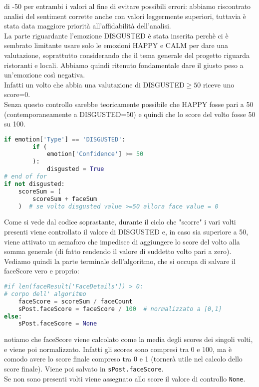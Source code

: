 di -50 per entrambi i valori al fine di evitare possibili errori: abbiamo riscontrato analisi del 
sentiment corrette anche con valori leggermente superiori, tuttavia è stata data maggiore priorità
all'affidabilità dell'analisi. \\
La parte riguardante l'emozione DISGUSTED è stata inserita perchè ci è sembrato limitante usare
solo le emozioni HAPPY e CALM per dare una valutazione, soprattutto considerando che il tema
generale del progetto riguarda ristoranti e locali. Abbiamo quindi ritenuto
fondamentale dare il giusto peso a un'emozione così negativa. \\
Infatti un volto che abbia una
valutazione di DISGUSTED$\geq50$ riceve uno score=0. \\
Senza questo controllo sarebbe teoricamente
possibile che HAPPY fosse pari a 50 (contemporaneamente a DISGUSTED=50) e quindi che lo score 
del volto fosse 50 su 100.
\begin{lstlisting}[language=Python]
    if emotion['Type'] == 'DISGUSTED':
        if (
            emotion['Confidence'] >= 50
        ):  
            disgusted = True
# end of for
if not disgusted:
    scoreSum = (
        scoreSum + faceSum
    )  # se volto disgusted value >=50 allora face value = 0
\end{lstlisting}
Come si vede dal codice soprastante, durante il ciclo che "scorre" i vari volti presenti viene
controllato il valore di DISGUSTED e, in caso sia superiore a 50, viene attivato un semaforo 
che impedisce di aggiungere lo score del volto alla somma generale (di fatto rendendo il valore
di suddetto volto pari a zero).\\
Vediamo quindi la parte terminale dell'algoritmo, che si occupa di salvare il faceScore vero e proprio:
\begin{lstlisting}[language=Python]
#if len(faceResult['FaceDetails']) > 0: 
# corpo dell' algoritmo 
    faceScore = scoreSum / faceCount 
    sPost.faceScore = faceScore / 100  # normalizzato a [0,1]
else:
    sPost.faceScore = None
\end{lstlisting}
notiamo che faceScore viene calcolato come la media degli scores dei singoli volti, e viene poi
normalizzato. Infatti gli scores sono compresi tra 0 e 100, ma è comodo avere lo score finale compreso
tra 0 e 1 (tornerà utile nel calcolo dello score finale). 
Viene poi salvato in \verb+sPost.faceScore+. \\
Se non sono presenti volti viene assegnato allo score il valore di controllo \verb+None+.
